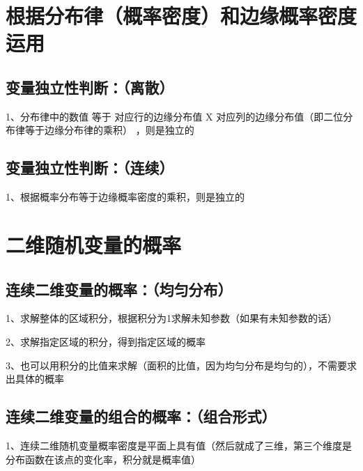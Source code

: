 \section{根据分布律（概率密度）和边缘概率密度运用}



\subsection{变量独立性判断：（离散）}

1、分布律中的数值 等于 对应行的边缘分布值 X 对应列的边缘分布值（即二位分布律等于边缘分布律的乘积） ，则是独立的



\subsection{变量独立性判断：（连续）}

1、根据概率分布等于边缘概率密度的乘积，则是独立的

\section{二维随机变量的概率}



\subsection{连续二维变量的概率：（均匀分布）}

1、求解整体的区域积分，根据积分为1求解未知参数（如果有未知参数的话）

2、求解指定区域的积分，得到指定区域的概率

3、也可以用积分的比值来求解（面积的比值，因为均匀分布是均匀的），不需要求出具体的概率



\subsection{连续二维变量的组合的概率：（组合形式）}

1、连续二维随机变量概率密度是平面上具有值（然后就成了三维，第三个维度是分布函数在该点的变化率，积分就是概率值）

